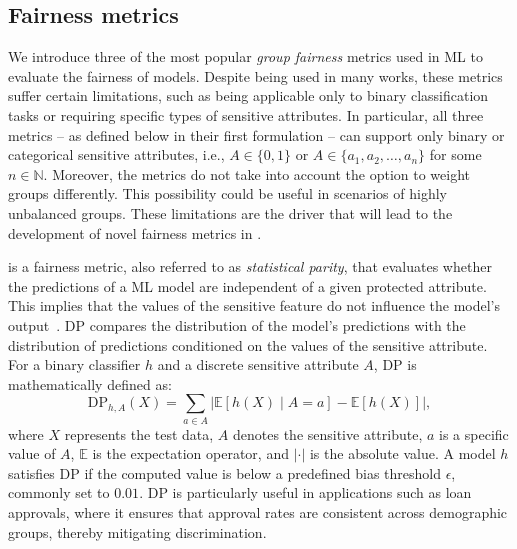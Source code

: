 \subsection{Fairness metrics}\label{subsec:fairness-metrics}
%
We introduce three of the most popular \emph{group fairness} metrics used in \gls{ML} to evaluate the fairness of models.
%
Despite being used in many works, these metrics suffer certain limitations, such as being applicable only to binary classification tasks or requiring specific types of sensitive attributes.
%
In particular, all three metrics -- as defined below in their first formulation -- can support only binary or categorical sensitive attributes, i.e., \( A \in \{0, 1\} \) or \( A \in \{a_1, a_2, \ldots, a_n\} \) for some \( n \in \mathbb{N} \).
%
Moreover, the metrics do not take into account the option to weight groups differently.
%
This possibility could be useful in scenarios of highly unbalanced groups.
%
These limitations are the driver that will lead to the development of novel fairness metrics in .


 is a fairness metric, also referred to as \emph{statistical parity}, that evaluates whether the predictions of a \gls{ML} model are independent of a given protected attribute.
%
This implies that the values of the sensitive feature do not influence the model's output~\cite{DBLP:conf/innovations/DworkHPRZ12}.
%
\Gls{DP} compares the distribution of the model's predictions with the distribution of predictions conditioned on the values of the sensitive attribute.
%
For a binary classifier \( h \) and a discrete sensitive attribute \( A \), \gls{DP} is mathematically defined as:
%
\begin{equation}
    \label{eq:dp}
    \text{DP}_{h,A}(X) = \sum_{a \in A} \left| \mathbb{E}[h(X) \mid A = a] - \mathbb{E}[h(X)] \right|,
\end{equation}
%
where \( X \) represents the test data, \( A \) denotes the sensitive attribute, \( a \) is a specific value of \( A \), \( \mathbb{E} \) is the expectation operator, and \( \left| \cdot \right| \) is the absolute value.
%
A model \( h \) satisfies DP if the computed value is below a predefined bias threshold \( \epsilon \), commonly set to \( 0.01 \).
%
\Gls{DP} is particularly useful in applications such as loan approvals, where it ensures that approval rates are consistent across demographic groups, thereby mitigating discrimination.


